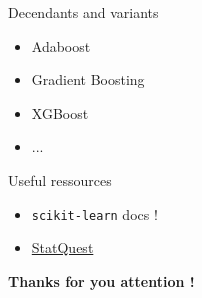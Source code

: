 \documentclass{irdbeamer}
\begin{document}
\begin{frame}{Decendants and variants}
    \begin{itemize}
        \item Adaboost
        \item Gradient Boosting
        \item XGBoost
        \item ...
    \end{itemize}
\end{frame}

\begin{frame}{Useful ressources}
\begin{itemize}
    \item \texttt{scikit-learn} docs !
    \item \href{https://www.youtube.com/@statquest}{StatQuest}
\end{itemize}
\end{frame}

\begin{frame}[plain]
    \Huge{\textbf{Thanks for you attention !}}
    
    \vfill
    
\end{frame}

\end{document}
